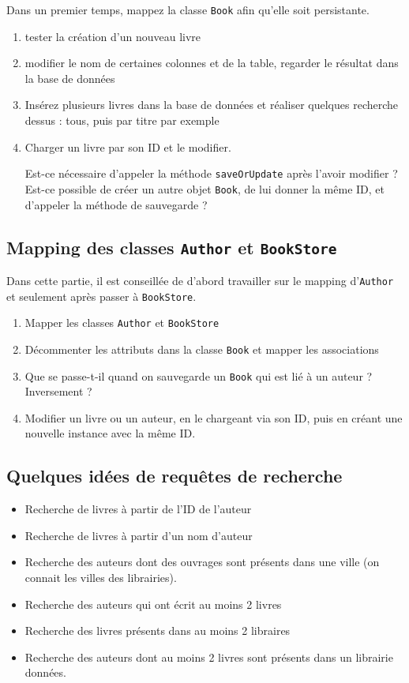 \documentclass[small,algo]{dushClass}
\begin{document}
Dans un premier temps, mappez la classe \texttt{Book} afin qu'elle soit persistante.\\

\begin{enumerate}
\item tester la création d'un nouveau livre
\item modifier le nom de certaines colonnes et de la table, regarder le résultat dans la base de données
\item Insérez plusieurs livres dans la base de données et réaliser quelques recherche dessus : tous,  puis par titre par exemple
\item Charger un livre par son ID et le modifier.\par
Est-ce nécessaire d'appeler la méthode \texttt{saveOrUpdate} après l'avoir modifier ? Est-ce possible de créer un autre objet \texttt{Book}, de lui donner la même ID, et d'appeler la méthode de sauvegarde ?
\end{enumerate}

\subsection{Mapping des classes \texttt{Author} et \texttt{BookStore}}
Dans cette partie, il est conseillée de d'abord travailler sur le mapping d'\texttt{Author} et seulement après passer à \texttt{BookStore}.\\

\begin{enumerate}
\item Mapper les classes \texttt{Author} et \texttt{BookStore}
\item Décommenter les attributs dans la classe \texttt{Book} et mapper les associations
\item Que se passe-t-il quand on sauvegarde un \texttt{Book} qui est lié à un auteur ? Inversement ?
\item Modifier un livre ou un auteur, en le chargeant via son ID, puis en créant une nouvelle instance avec la même ID.
\end{enumerate}

\subsection{Quelques idées de requêtes de recherche}
\begin{itemize}
\item Recherche de livres à partir de l'ID de l'auteur
\item Recherche de livres à partir d'un nom d'auteur
\item Recherche des auteurs dont des ouvrages sont présents dans une ville (on connait les villes des librairies).
\item Recherche des auteurs qui ont écrit au moins 2 livres
\item Recherche des livres présents dans au moins 2 libraires
\item Recherche des auteurs dont au moins 2 livres sont présents dans un librairie données.
\end{itemize}
\end{document}
